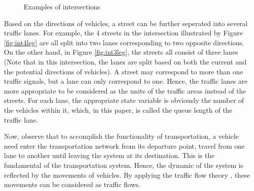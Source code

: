 \documentclass[preprint,authoryear,12pt]{elsarticle}
\begin{document}
\begin{figure}[ht]
  \centering
  \quad
  \caption{Examples of intersections}
\end{figure}

Based on the directions of vehicles, a street can be further seperated into several traffic lanes. For example, the 4 streets in the intersection illustrated by Figure \ref{fig:int4leg} are all split into two lanes corresponding to two opposite directions. On the other hand, in Figure \ref{fig:int3leg}, the streets all consist of three lanes (Note that in this intersection, the lanes are split based on both the current and the potential directions of vehicles). A street may correspond to more than one traffic signals, but a lane can only correspond to one. Hence, the traffic lanes are more appropriate to be considered as the units of the traffic areas instead of the streets.
For each lane, the appropriate state variable is obviously the number of the vehicles within it, which, in this paper, is called the queue length of the traffic lane.

Now, observe that to accomplish the functionality of transportation, a vehicle need enter the transportation network from its departure point, travel from one lane to another until leaving the system at its destination. This is the fundamental of the transportation system. Hence, the dynamic of the system is reflected by the movements of vehicles. By applying the traffic flow theory \citep{nathan_h_gartner_revised_2005}, these movements can be considered as traffic flows.
\end{document}
